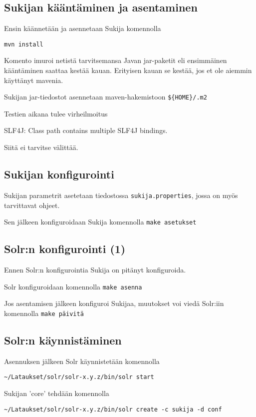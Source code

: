 \documentclass[12pt]{article}
\begin{document}
\subsection*{Sukijan kääntäminen ja asentaminen}

Ensin käännetään ja asennetaan Sukija komennolla

\verb=mvn install=

Komento imuroi netistä tarvitsemansa Javan jar-paketit eli ensimmäinen
kääntäminen saattaa kestää kauan. Erityisen kauan se kestää, jos et
ole aiemmin käyttänyt mavenia.

Sukijan jar-tiedostot asennetaan maven-hakemistoon \verb|${HOME}/.m2|

Testien aikana tulee virheilmoitus

SLF4J: Class path contains multiple SLF4J bindings.

Siitä ei tarvitse välittää.


\subsection*{Sukijan konfigurointi}

Sukijan parametrit asetetaan tiedostossa \verb|sukija.properties|,
jossa on myös tarvittavat ohjeet.

Sen jälkeen konfiguroidaan Sukija komennolla \verb|make asetukset|


\subsection*{Solr:n konfigurointi (1)}

Ennen Solr:n konfigurointia Sukija on pitänyt konfiguroida.

Solr konfiguroidaan komennolla \verb|make asenna|

Jos asentamisen jälkeen konfiguroi Sukijaa,
muutokset voi viedä Solr:iin komennolla \verb|make päivitä|



\subsection*{Solr:n käynnistäminen}

Asennuksen jälkeen Solr käynnistetään komennolla

\verb|~/Lataukset/solr/solr-x.y.z/bin/solr start|

Sukijan 'core' tehdään komennolla

\verb|~/Lataukset/solr/solr-x.y.z/bin/solr create -c sukija -d conf|
\end{document}
